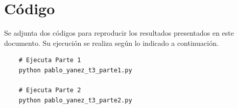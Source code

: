 \documentclass[
  letterpaper,
  twocolumn,
  9pt,
  journal,
  final]{IEEEtran}
\begin{document}
\section{Código}

Se adjunta dos códigos para reproducir los resultados presentados en este documento. Su ejecución se realiza según lo indicado a continuación.

\begin{verbatim}
	# Ejecuta Parte 1
	python pablo_yanez_t3_parte1.py

	# Ejecuta Parte 2
	python pablo_yanez_t3_parte2.py
\end{verbatim}





\nocite{*}


\end{document}
